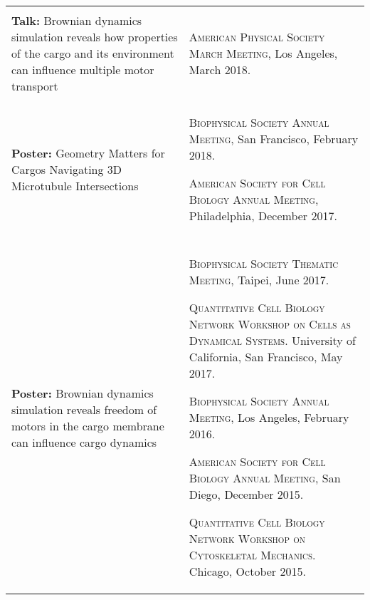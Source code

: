 \documentclass[letterpaper,10pt]{article} %
\makeatletter
\newcommand\cellwidth{\TX@col@width}
\makeatother
\begin{document}
\begin{tabularx}{\textwidth}{p{} | X}
\multicolumn{2}{c}{} \\

\begin{minipage}{.4\textwidth}
\textbf{Talk:} Brownian dynamics simulation reveals how properties of the cargo and its environment can influence multiple motor transport
\end{minipage}
&
\begin{minipage}{\cellwidth}
\begin{description}[itemsep=.25ex,labelsep=0em]
\item \textsc{American Physical Society March Meeting}, Los Angeles, March 2018.
\end{description}
\end{minipage} \\

\multicolumn{2}{c}{} \\

\begin{minipage}{.4\textwidth}
\textbf{Poster:} Geometry Matters for Cargos Navigating 3D Microtubule Intersections
\end{minipage}
&
\begin{minipage}{\cellwidth}
\begin{description}[itemsep=.25ex,labelsep=0em]
\item \textsc{Biophysical Society Annual Meeting}, San Francisco, February 2018.
\item \textsc{American Society for Cell Biology Annual Meeting}, Philadelphia, December 2017.
\end{description}
\end{minipage} \\

\multicolumn{2}{c}{} \\

\begin{minipage}{.4\textwidth}
\textbf{Poster:} Brownian dynamics simulation reveals freedom of motors in the cargo membrane can influence cargo dynamics
\end{minipage}
&
\begin{minipage}{\cellwidth}
\begin{description}[itemsep=.25ex,labelsep=0em]
\item \textsc{Biophysical Society Thematic Meeting}, Taipei, June 2017.
\item \textsc{Quantitative Cell Biology Network Workshop on Cells as Dynamical Systems.} University of California, San Francisco, May 2017.
\item \textsc{Biophysical Society Annual Meeting}, Los Angeles, February 2016.
\item \textsc{American Society for Cell Biology Annual Meeting}, San Diego, December 2015.
\item \textsc{Quantitative Cell Biology Network Workshop on Cytoskeletal Mechanics.} Chicago, October 2015.
\end{description}
\end{minipage} \\


\end{tabularx}
\end{document}
